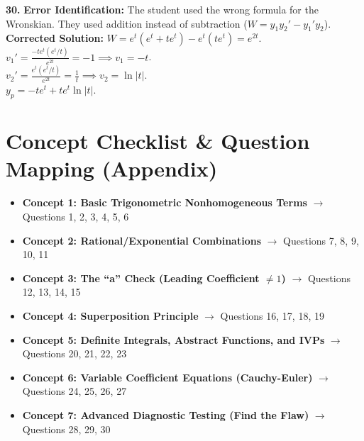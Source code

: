 \documentclass[11pt]{article}
\begin{document}
\vspace{0.5cm}
\textbf{30.} \textbf{Error Identification:} The student used the wrong formula for the Wronskian. They used addition instead of subtraction ($W = y_1 y_2' - y_1' y_2$). \\
\textbf{Corrected Solution:} $W = e^t(e^t + te^t) - e^t(te^t) = e^{2t}$. \\
$v_1' = \frac{-te^t(e^t/t)}{e^{2t}} = -1 \implies v_1 = -t$. \\
$v_2' = \frac{e^t(e^t/t)}{e^{2t}} = \frac{1}{t} \implies v_2 = \ln|t|$. \\
$y_p = -te^t + te^t\ln|t|$.

\newpage

\section{Concept Checklist \& Question Mapping (Appendix)}
\begin{itemize}
    \item \textbf{Concept 1: Basic Trigonometric Nonhomogeneous Terms} $\rightarrow$ Questions 1, 2, 3, 4, 5, 6
    \item \textbf{Concept 2: Rational/Exponential Combinations} $\rightarrow$ Questions 7, 8, 9, 10, 11
    \item \textbf{Concept 3: The ``a'' Check (Leading Coefficient $\neq 1$)} $\rightarrow$ Questions 12, 13, 14, 15
    \item \textbf{Concept 4: Superposition Principle} $\rightarrow$ Questions 16, 17, 18, 19
    \item \textbf{Concept 5: Definite Integrals, Abstract Functions, and IVPs} $\rightarrow$ Questions 20, 21, 22, 23
    \item \textbf{Concept 6: Variable Coefficient Equations (Cauchy-Euler)} $\rightarrow$ Questions 24, 25, 26, 27
    \item \textbf{Concept 7: Advanced Diagnostic Testing (Find the Flaw)} $\rightarrow$ Questions 28, 29, 30
\end{itemize}
\end{document}

